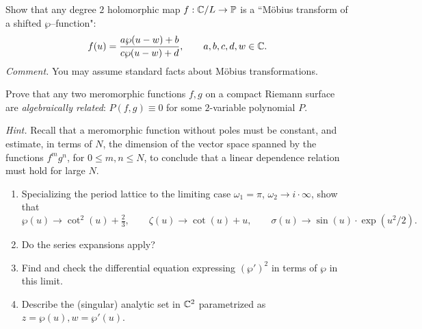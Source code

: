 \documentclass[12pt]{article}  %
\begin{document}
\begin{problem}[3 (from RS2)]
Show that any degree $2$ holomorphic map $f:\mathbb{C}/L \to \mathbb{P}$ is a “M{\"o}bius transform of a shifted $\wp$–function":
\[
  f(u) = \frac{a\wp(u-w)+b}{c\wp(u-w)+d}, \qquad a,b,c,d,w \in \mathbb{C}.
\]
\emph{Comment.} You may assume standard facts about M{\"o}bius transformations.
\end{problem}

\begin{solution}
\end{solution}

\begin{problem}[4 (from RS2)]
Prove that any two meromorphic functions $f,g$ on a compact Riemann surface are \emph{algebraically related}: $P(f,g)\equiv 0$ for some $2$-variable polynomial $P$.

\emph{Hint.} Recall that a meromorphic function without poles must be constant, and estimate, in terms of $N$, the dimension of the vector space spanned by the functions $f^m g^n$, for $0\le m,n\le N$, to conclude that a linear dependence relation must hold for large $N$.
\end{problem}

\begin{solution}
\end{solution}

\begin{problem}[5]
\begin{enumerate}
  \item Specializing the period lattice to the limiting case $\omega_1 = \pi$, $\omega_2 \to i\cdot\infty$, show that
  \[
    \wp(u) \to \cot^2(u) + \tfrac{2}{3}, \qquad
    \zeta(u) \to \cot(u)+u, \qquad
    \sigma(u) \to \sin(u)\cdot \exp(u^2/2).
  \]
  \item Do the series expansions apply?
  \item Find and check the differential equation expressing $(\wp')^2$ in terms of $\wp$ in this limit.
  \item Describe the (singular) analytic set in $\mathbb{C}^2$ parametrized as $z=\wp(u), w=\wp'(u)$.
\end{enumerate}
\end{problem}

\begin{solution}
\end{solution}
\end{document}
